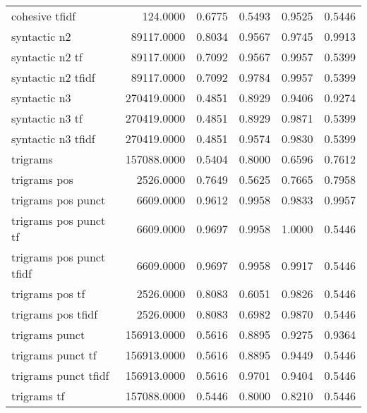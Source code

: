 \begin{tabular}{lrrrrr}
cohesive tfidf             &    124.0000 & 0.6775 &       0.5493 &         0.9525 &               0.5446 \\
syntactic n2               &  89117.0000 & 0.8034 &       0.9567 &         0.9745 &               0.9913 \\
syntactic n2 tf            &  89117.0000 & 0.7092 &       0.9567 &         0.9957 &               0.5399 \\
syntactic n2 tfidf         &  89117.0000 & 0.7092 &       0.9784 &         0.9957 &               0.5399 \\
syntactic n3               & 270419.0000 & 0.4851 &       0.8929 &         0.9406 &               0.9274 \\
syntactic n3 tf            & 270419.0000 & 0.4851 &       0.8929 &         0.9871 &               0.5399 \\
syntactic n3 tfidf         & 270419.0000 & 0.4851 &       0.9574 &         0.9830 &               0.5399 \\
trigrams                   & 157088.0000 & 0.5404 &       0.8000 &         0.6596 &               0.7612 \\
trigrams pos               &   2526.0000 & 0.7649 &       0.5625 &         0.7665 &               0.7958 \\
trigrams pos punct         &   6609.0000 & 0.9612 &       0.9958 &         0.9833 &               0.9957 \\
trigrams pos punct tf      &   6609.0000 & 0.9697 &       0.9958 &         1.0000 &               0.5446 \\
trigrams pos punct tfidf   &   6609.0000 & 0.9697 &       0.9958 &         0.9917 &               0.5446 \\
trigrams pos tf            &   2526.0000 & 0.8083 &       0.6051 &         0.9826 &               0.5446 \\
trigrams pos tfidf         &   2526.0000 & 0.8083 &       0.6982 &         0.9870 &               0.5446 \\
trigrams punct             & 156913.0000 & 0.5616 &       0.8895 &         0.9275 &               0.9364 \\
trigrams punct tf          & 156913.0000 & 0.5616 &       0.8895 &         0.9449 &               0.5446 \\
trigrams punct tfidf       & 156913.0000 & 0.5616 &       0.9701 &         0.9404 &               0.5446 \\
trigrams tf                & 157088.0000 & 0.5446 &       0.8000 &         0.8210 &               0.5446 \\

\end{tabular}
